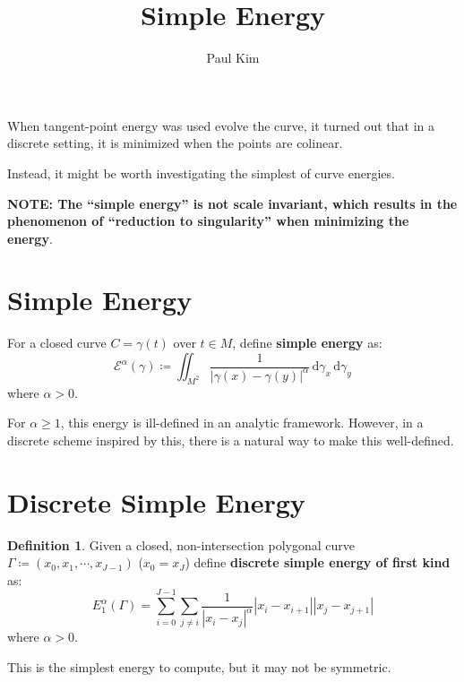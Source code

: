 \documentclass[a4paper]{article}
\title{Simple Energy}
\author{Paul Kim}
\newcommand{\dgamma}{\, \text{d}\gamma}
\theoremstyle{definition}
\newtheorem{definition}{Definition}
\begin{document}
\maketitle
When tangent-point energy was used evolve the curve, it turned out that in a discrete setting,
it is minimized when the points are colinear.

Instead, it might be worth investigating the simplest of curve energies.

\textbf{NOTE: The ``simple energy'' is not scale invariant, which results in the phenomenon of ``reduction to singularity'' when minimizing the energy}.
\section{Simple Energy}
For a closed curve $C = \gamma(t)$ over $t \in M$, define \textbf{simple energy} as:
\begin{equation}
    \mathcal{E}^{\alpha} \left( \gamma \right) \coloneqq \iint_{M^2} \frac{1}{|\gamma(x) - \gamma(y)|^{\alpha}} \dgamma_x \dgamma_y
\end{equation}
where $\alpha > 0$.

For $\alpha \geq 1$, this energy is ill-defined in an analytic framework.
However, in a discrete scheme inspired by this, there is a natural way to make this well-defined.

\section{Discrete Simple Energy}
\begin{definition}
    Given a closed, non-intersection polygonal curve $\Gamma \coloneqq \left( x_0, x_1, \cdots, x_{J-1} \right)$
    ($x_0 = x_J$)
    define \textbf{discrete simple energy of first kind} as:
    \begin{equation}
        E_{1}^{\alpha}\left( \Gamma \right) = \sum_{i=0}^{J-1} \sum_{j \neq i} \frac{1}{|x_i -x_j|^{\alpha}} |x_i - x_{i+1}| |x_j - x_{j+1}|
    \end{equation}
    where $\alpha > 0$.
\end{definition}

This is the simplest energy to compute, but it may not be symmetric.
\end{document}
